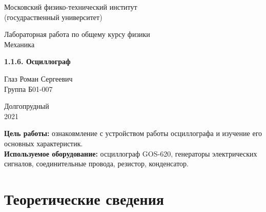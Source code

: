 \documentclass[a4paper, 12pt]{article} %
\begin{document}


\begin{titlepage}

	\newpage
	\begin{center}
		\normalsize Московский физико-технический институт \\(госудраственный университет)
	\end{center}

	\vspace{6em}

	\begin{center}
		\Large Лабораторная работа по общему курсу физики\\Механика
	\end{center}

	\vspace{1em}

	\begin{center}
		\Large \textbf{1.1.6. Осциллограф}
	\end{center}

	\vspace{2em}

	\begin{center}
		\large Глаз Роман Сергеевич \\
		Группа Б01-007
	\end{center}

	\vspace{\fill}

	\begin{center}
	Долгопрудный \\2021
	\end{center}
	
\end{titlepage}



	\thispagestyle{empty}
	\newpage
	\tableofcontents
	\newpage
	\setcounter{page}{1}

\textbf{Цель работы:} ознаковмление с устройством работы осциллографа и изучение его основных характеристик.\\

\textbf{Используемое оборудование:} осциллограф GOS-620, генераторы электрических сигналов, соединительные провода, резистор, конденсатор.

\section{Теоретические сведения}
\end{document}
